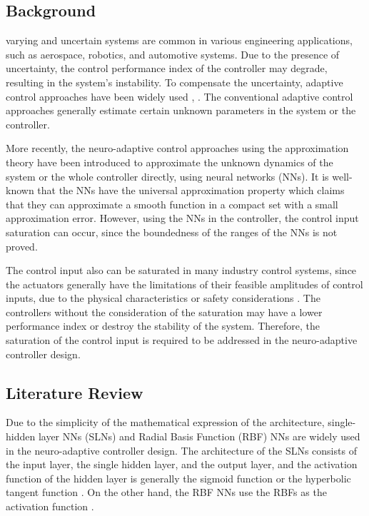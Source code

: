 \documentclass[lettersize,journal]{IEEEtran}
\begin{document}
\subsection{Background}

 varying and uncertain systems are common in various engineering applications, such as aerospace, robotics, and automotive systems. 
Due to the presence of uncertainty, the control performance index of the controller may degrade, resulting in the system's instability.
To compensate the uncertainty, adaptive control approaches have been widely used \cite{RN4}, \cite{RN2}.
The conventional adaptive control approaches generally estimate certain unknown parameters in the system or the controller.

More recently, the neuro-adaptive control approaches using the approximation theory \cite{RN1} have been introduced to approximate the unknown dynamics of the system or the whole controller directly, using neural networks (NNs).
It is well-known that the NNs have the universal approximation property which claims that they can approximate a smooth function in a compact set with a small approximation error.
However, using the NNs in the controller, the control input saturation can occur, since the boundedness of the ranges of the NNs is not proved.

The control input also can be saturated in many industry control systems, since the actuators generally have the limitations of their feasible amplitudes of control inputs, due to the physical characteristics or safety considerations \cite{RN18}.
The controllers without the consideration of the saturation may have a lower performance index or destroy the stability of the system.
Therefore, the saturation of the control input is required to be addressed in the neuro-adaptive controller design.

\subsection{Literature Review}

Due to the simplicity of the mathematical expression of the architecture, single-hidden layer NNs (SLNs) \cite{RN29} and Radial Basis Function (RBF) NNs \cite{RN26} are widely used in the neuro-adaptive controller design.
The architecture of the SLNs consists of the input layer, the single hidden layer, and the output layer, and the activation function of the hidden layer is generally the sigmoid function or the hyperbolic tangent function \cite{RN44, RN56, RN54, RN3, RN41}.
On the other hand, the RBF NNs use the RBFs as the activation function \cite{RN10, RN34, RN37, RN31, RN7, RN11}.
\end{document}
